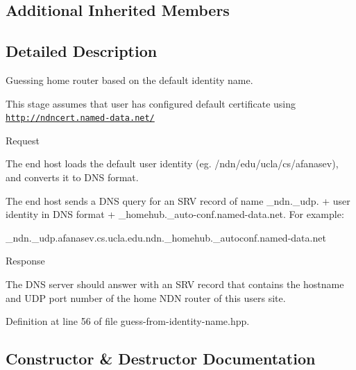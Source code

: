 \subsection*{Additional Inherited Members}


\subsection{Detailed Description}
Guessing home router based on the default identity name. 

This stage assumes that user has configured default certificate using \href{http://ndncert.named-data.net/}{\tt http\+://ndncert.\+named-\/data.\+net/}


\begin{DoxyItemize}
\item Request

The end host loads the default user identity (eg. /ndn/edu/ucla/cs/afanasev), and converts it to D\+NS format.

The end host sends a D\+NS query for an S\+RV record of name \+\_\+ndn.\+\_\+udp. + user identity in D\+NS format + \+\_\+homehub.\+\_\+auto-\/conf.\+named-\/data.\+net. For example\+: \begin{DoxyVerb}_ndn._udp.afanasev.cs.ucla.edu.ndn._homehub._autoconf.named-data.net
\end{DoxyVerb}

\item Response

The D\+NS server should answer with an S\+RV record that contains the hostname and U\+DP port number of the home N\+DN router of this user\textquotesingle{}s site. 
\end{DoxyItemize}

Definition at line 56 of file guess-\/from-\/identity-\/name.\+hpp.



\subsection{Constructor \& Destructor Documentation}
